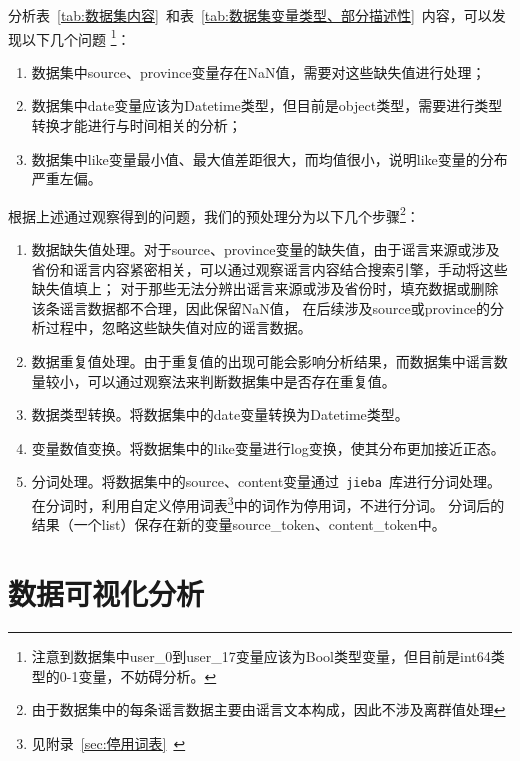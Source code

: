 \documentclass[UTF8]{ctexart}
\begin{document}
分析表~\ref{tab:数据集内容}~和表~\ref{tab:数据集变量类型、部分描述性}~内容，可以发现以下几个问题
\footnote{注意到数据集中user\_0到user\_17变量应该为Bool类型变量，但目前是int64类型的0-1变量，不妨碍分析。}：
\begin{enumerate}
    \item 数据集中source、province变量存在NaN值，需要对这些缺失值进行处理；
    \item 数据集中date变量应该为Datetime类型，但目前是object类型，需要进行类型转换才能进行与时间相关的分析；
    \item 数据集中like变量最小值、最大值差距很大，而均值很小，说明like变量的分布严重左偏。
\end{enumerate}

根据上述通过观察得到的问题，我们的预处理分为以下几个步骤\footnote{由于数据集中的每条谣言数据主要由谣言文本构成，因此不涉及离群值处理}：
\begin{enumerate}
    \item 数据缺失值处理。对于source、province变量的缺失值，由于谣言来源或涉及省份和谣言内容紧密相关，可以通过观察谣言内容结合搜索引擎，手动将这些缺失值填上；
    对于那些无法分辨出谣言来源或涉及省份时，填充数据或删除该条谣言数据都不合理，因此保留NaN值，
    在后续涉及source或province的分析过程中，忽略这些缺失值对应的谣言数据。
    \item 数据重复值处理。由于重复值的出现可能会影响分析结果，而数据集中谣言数量较小，可以通过观察法来判断数据集中是否存在重复值。
    \item 数据类型转换。将数据集中的date变量转换为Datetime类型。 %
    \item 变量数值变换。将数据集中的like变量进行log变换，使其分布更加接近正态。 %
    \item 分词处理。将数据集中的source、content变量通过~\verb|jieba|~库进行分词处理。
    在分词时，利用自定义停用词表\footnote{见附录~\ref{sec:停用词表}~}中的词作为停用词，不进行分词。
    分词后的结果（一个list）保存在新的变量source\_token、content\_token中。 %
\end{enumerate}



\section{数据可视化分析}
\end{document}
